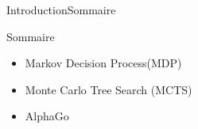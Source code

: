 \begin{frame}{Introduction}{Sommaire}
	\begin{center}
		\begin{block}{Sommaire}
			\begin{itemize}[label=\textbullet, font=\LARGE \color{black}]
				\item Markov Decision Process(MDP)
				\item Monte Carlo Tree Search (MCTS)
				\item AlphaGo
			\end{itemize}
		\end{block}
	\end{center}
\end{frame}